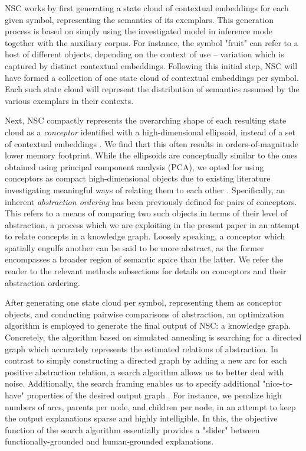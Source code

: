 NSC works by first generating a state cloud of contextual embeddings for each given symbol, representing the semantics of its exemplars. This generation process is based on simply using the investigated model in inference mode together with the auxiliary corpus. For instance, the symbol "fruit" can refer to a host of different objects, depending on the context of use -- variation which is captured by distinct contextual embeddings. Following this initial step, NSC will have formed a collection of one state cloud of contextual embeddings per symbol. Each such state cloud will represent the distribution of semantics assumed by the various exemplars in their contexts.

Next, NSC compactly represents the overarching shape of each resulting state cloud as a \textit{conceptor} identified with a high-dimensional ellipsoid, instead of a set of contextual embeddings \citep{jaeger_controlling_2017}. We find that this often results in orders-of-magnitude lower memory footprint. While the ellipsoids are conceptually similar to the ones obtained using principal component analysis (PCA), we opted for using conceptors as compact high-dimensional objects due to existing literature investigating meaningful ways of relating them to each other \citep{jaeger_using_nodate}. Specifically, an inherent \textit{abstraction ordering} has been previously defined for pairs of conceptors. This refers to a means of comparing two such objects in terms of their level of abstraction, a process which we are exploiting in the present paper in an attempt to relate concepts in a knowledge graph. Loosely speaking, a conceptor which spatially engulfs another can be said to be more abstract, as the former encompasses a broader region of semantic space than the latter. We refer the reader to the relevant methods subsections for details on conceptors and their abstraction ordering.

After generating one state cloud per symbol, representing them as conceptor objects, and conducting pairwise comparisons of abstraction, an optimization algorithm is employed to generate the final output of NSC: a knowledge graph. Concretely, the algorithm based on simulated annealing is searching for a directed graph which accurately represents the estimated relations of abstraction. In contrast to simply constructing a directed graph by adding a new arc for each positive abstraction relation, a search algorithm allows us to better deal with noise. Additionally, the search framing enables us to specify additional "nice-to-have" properties of the desired output graph \citep{madsen_post-hoc_2021}. For instance, we penalize high numbers of arcs, parents per node, and children per node, in an attempt to keep the output explanations sparse and highly intelligible. In this, the objective function of the search algorithm essentially provides a "slider" between functionally-grounded and human-grounded explanations.

